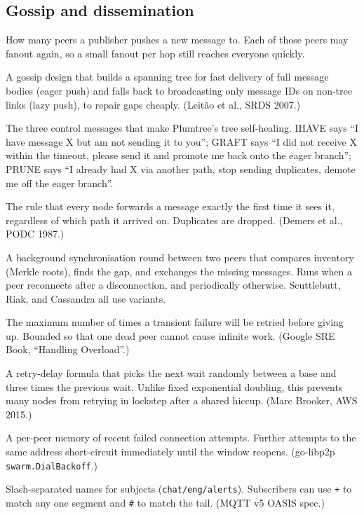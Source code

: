 \documentclass[11pt,a4paper]{article}
\begin{document}
\subsection*{Gossip and dissemination}

\begin{description}[leftmargin=1em,style=nextline]
    \item[\textbf{Fanout.}]
    How many peers a publisher pushes a new message to. Each of
    those peers may fanout again, so a small fanout per hop
    still reaches everyone quickly.
    \item[\textbf{Plumtree (eager + lazy push).}]
    A gossip design that builds a spanning tree for fast
    delivery of full message bodies (eager push) and falls back
    to broadcasting only message IDs on non-tree links (lazy
    push), to repair gaps cheaply. (Leit\~ao et al., SRDS 2007.)
    \item[\textbf{IHAVE / GRAFT / PRUNE.}]
    The three control messages that make Plumtree's tree
    self-healing. IHAVE says ``I have message X but am not
    sending it to you''; GRAFT says ``I did not receive X
    within the timeout, please send it and promote me back onto
    the eager branch''; PRUNE says ``I already had X via
    another path, stop sending duplicates, demote me off the
    eager branch''.
    \item[\textbf{First-seen forwarding.}]
    The rule that every node forwards a message exactly the
    first time it sees it, regardless of which path it arrived
    on. Duplicates are dropped. (Demers et al., PODC 1987.)
    \item[\textbf{Anti-entropy reconciliation.}]
    A background synchronisation round between two peers that
    compares inventory (Merkle roots), finds the gap, and
    exchanges the missing messages. Runs when a peer reconnects
    after a disconnection, and periodically otherwise.
    Scuttlebutt, Riak, and Cassandra all use variants.
    \item[\textbf{Retry budget.}]
    The maximum number of times a transient failure will be
    retried before giving up. Bounded so that one dead peer
    cannot cause infinite work. (Google SRE Book, ``Handling
    Overload''.)
    \item[\textbf{Decorrelated-jitter backoff.}]
    A retry-delay formula that picks the next wait randomly
    between a base and three times the previous wait. Unlike
    fixed exponential doubling, this prevents many nodes from
    retrying in lockstep after a shared hiccup. (Marc Brooker,
    AWS 2015.)
    \item[\textbf{Dial-backoff cache.}]
    A per-peer memory of recent failed connection attempts.
    Further attempts to the same address short-circuit
    immediately until the window reopens. (go-libp2p
    \texttt{swarm.DialBackoff}.)
    \item[\textbf{MQTT topics.}]
    Slash-separated names for subjects (\texttt{chat/eng/alerts}).
    Subscribers can use \texttt{+} to match any one segment and
    \texttt{\#} to match the tail. (MQTT v5 OASIS spec.)
\end{description}
\end{document}
